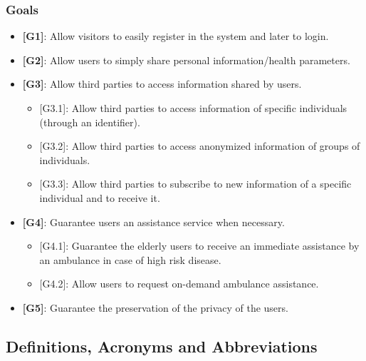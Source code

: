 \documentclass[12pt,a4paper]{article}
\begin{document}
	\subsubsection{Goals}
	\begin{itemize}
		\item {\textbf[}\textbf{G1}{\textbf]}: Allow visitors to easily register in the system and later to login.
		\item {\textbf[}\textbf{G2}{\textbf]}: Allow users to simply share personal information/health parameters.
		\item {\textbf[}\textbf{G3}{\textbf]}: Allow third parties to access information shared by users.
		\begin{itemize}
			\item {[G3.1]}: Allow third parties to access information of specific individuals (through an identifier).
			\item {[G3.2]}: Allow third parties to access anonymized information of groups of individuals.
			\item {[G3.3]}: Allow third parties to subscribe to new information of a specific individual and to receive it.
		\end{itemize}
		\item {\textbf[}\textbf{G4}{\textbf]}: Guarantee users an assistance service when necessary.
			\begin{itemize}
				\item {[}{G4.1}{]}: Guarantee the elderly users to receive an immediate assistance by an ambulance in case of high risk disease.
				\item {[}{G4.2}{]}: Allow users to request on-demand ambulance assistance.
			\end{itemize}
		\item {\textbf[}\textbf{G5}{\textbf]}: Guarantee the preservation of the privacy of the users.
	\end{itemize}


	\subsection{Definitions, Acronyms and Abbreviations}
\end{document}
